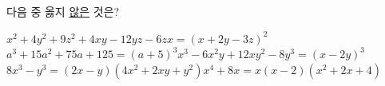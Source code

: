 다음 중 옳지 \underline{않은} 것은?
\begin{choicesv}{$x^2+4y^2+9z^2+4xy-12yz-6zx=(x+2y-3z)^2$}{$a^3+15a^2+75a+125=(a+5)^3$}{$x^3-6x^2y+12xy^2-8y^3=(x-2y)^3$}{$8x^3-y^3=(2x-y)(4x^2+2xy+y^2)$}{$x^4+8x=x(x-2)(x^2+2x+4)$}\end{choicesv}
